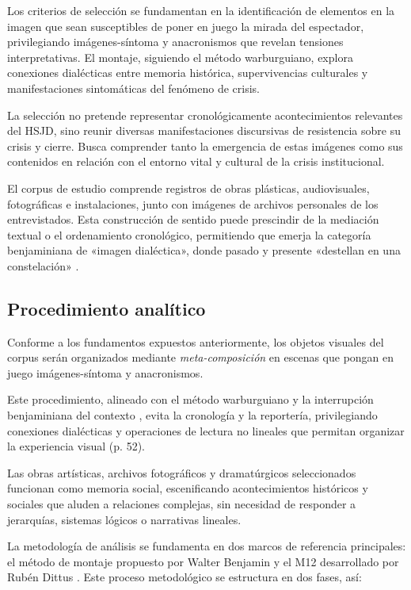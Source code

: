 \textcolor{edit30sept}{Los criterios de selección se fundamentan en la identificación de elementos en la imagen que sean susceptibles de poner en juego la mirada del espectador, privilegiando imágenes-síntoma y anacronismos que revelan tensiones interpretativas. El montaje, siguiendo el método warburguiano, explora conexiones dialécticas entre memoria histórica, supervivencias culturales y manifestaciones sintomáticas del fenómeno de crisis.}

La selección no pretende representar cronológicamente acontecimientos relevantes del HSJD, sino reunir diversas manifestaciones discursivas de resistencia sobre su crisis y cierre. Busca comprender tanto la emergencia de estas imágenes como sus contenidos en relación con el entorno vital y cultural de la crisis institucional.

El corpus de estudio comprende registros de obras plásticas, audiovisuales, fotográficas e instalaciones, junto con imágenes de archivos personales de los entrevistados. Esta construcción de sentido puede prescindir de la mediación textual o el ordenamiento cronológico, permitiendo que emerja la categoría benjaminiana de «imagen dialéctica», donde pasado y presente «destellan en una constelación» \parencite[p. 109]{Abril2007}.

\subsection{Procedimiento analítico}

Conforme a los fundamentos expuestos anteriormente, los objetos visuales del corpus serán organizados mediante \textit{meta-composición} en escenas que pongan en juego imágenes-síntoma y anacronismos.

Este procedimiento, alineado con el método warburguiano y la interrupción benjaminiana del contexto \parencite{Benjamin2004}, evita la cronología y la reportería, privilegiando conexiones dialécticas y operaciones de lectura no lineales que permitan organizar la experiencia visual (p. 52).

Las obras artísticas, archivos fotográficos y dramatúrgicos seleccionados funcionan como memoria social, escenificando acontecimientos históricos y sociales que aluden a relaciones complejas, sin necesidad de responder a jerarquías, sistemas lógicos o narrativas lineales.

La metodología de análisis se fundamenta en dos marcos de referencia principales: el método de montaje propuesto por Walter Benjamin \parencite{BuckMorss1989} y el M12 desarrollado por Rubén Dittus \parencite{Aliaga2022}. Este proceso metodológico se estructura en dos fases, así:

